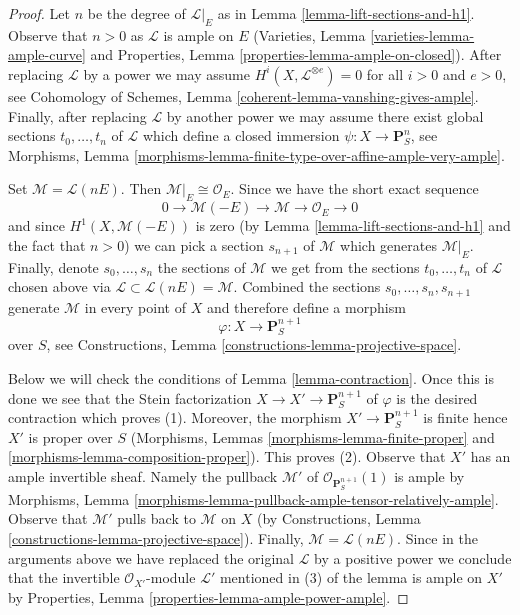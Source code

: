 \documentclass{stacks-project}
\theoremstyle{plain}
\theoremstyle{definition}
\theoremstyle{remark}
\numberwithin{equation}{subsection}
\begin{document}
\begin{proof}
Let $n$ be the degree of $\mathcal{L}|_E$ as in
Lemma \ref{lemma-lift-sections-and-h1}.
Observe that $n > 0$ as $\mathcal{L}$ is ample on $E$
(Varieties, Lemma \ref{varieties-lemma-ample-curve} and
Properties, Lemma \ref{properties-lemma-ample-on-closed}).
After replacing $\mathcal{L}$ by a power we may assume
$H^i(X, \mathcal{L}^{\otimes e}) = 0$ for all $i > 0$ and $e > 0$, see
Cohomology of Schemes,
Lemma \ref{coherent-lemma-vanshing-gives-ample}.
Finally, after replacing $\mathcal{L}$ by another power we may assume
there exist global sections $t_0, \ldots, t_n$ of $\mathcal{L}$
which define a closed immersion $\psi : X \to \mathbf{P}^n_S$, see
Morphisms, Lemma
\ref{morphisms-lemma-finite-type-over-affine-ample-very-ample}.

\medskip\noindent
Set $\mathcal{M} = \mathcal{L}(nE)$. Then $\mathcal{M}|_E \cong \mathcal{O}_E$.
Since we have the short exact sequence
$$
0 \to \mathcal{M}(-E) \to \mathcal{M} \to \mathcal{O}_E \to 0
$$
and since $H^1(X, \mathcal{M}(-E))$ is zero
(by Lemma \ref{lemma-lift-sections-and-h1} and the fact that $n > 0$)
we can pick a section $s_{n + 1}$ of $\mathcal{M}$ which generates
$\mathcal{M}|_E$.
Finally, denote $s_0, \ldots, s_n$ the sections of $\mathcal{M}$
we get from the sections $t_0, \ldots, t_n$ of $\mathcal{L}$
chosen above via $\mathcal{L} \subset \mathcal{L}(nE) = \mathcal{M}$.
Combined the sections $s_0, \ldots, s_n, s_{n + 1}$
generate $\mathcal{M}$ in every point of $X$ and therefore define
a morphism
$$
\varphi : X \longrightarrow \mathbf{P}^{n + 1}_S
$$
over $S$, see Constructions, Lemma \ref{constructions-lemma-projective-space}.

\medskip\noindent
Below we will check the conditions of Lemma \ref{lemma-contraction}.
Once this is done we see that the Stein factorization
$X \to X' \to \mathbf{P}^{n + 1}_S$ of $\varphi$ is the desired contraction
which proves (1).
Moreover, the morphism $X' \to \mathbf{P}^{n + 1}_S$ is finite
hence $X'$ is proper over $S$
(Morphisms, Lemmas \ref{morphisms-lemma-finite-proper} and
\ref{morphisms-lemma-composition-proper}). This proves (2).
Observe that $X'$ has an ample invertible sheaf. Namely the pullback
$\mathcal{M}'$ of $\mathcal{O}_{\mathbf{P}^{n + 1}_S}(1)$ is ample by
Morphisms, Lemma \ref{morphisms-lemma-pullback-ample-tensor-relatively-ample}.
Observe that $\mathcal{M}'$ pulls back to $\mathcal{M}$ on $X$
(by Constructions, Lemma \ref{constructions-lemma-projective-space}).
Finally, $\mathcal{M} = \mathcal{L}(nE)$. Since in the arguments above
we have replaced the original $\mathcal{L}$ by a positive power
we conclude that the invertible $\mathcal{O}_{X'}$-module $\mathcal{L}'$
mentioned in (3) of the lemma is ample on $X'$ by
Properties, Lemma \ref{properties-lemma-ample-power-ample}.


\end{proof}
\end{document}

